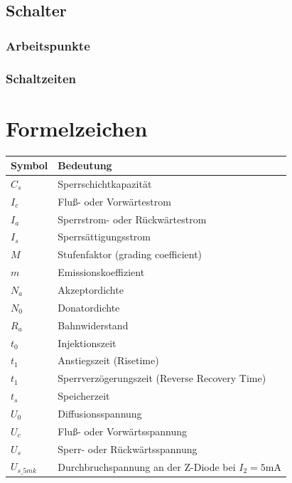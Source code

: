 \documentclass[
	a4paper, %
	12pt, %
]{CSUniSchoolLabReport}
\begin{document}
\subsection{Schalter}
\subsubsection{Arbeitspunkte}
\subsubsection{Schaltzeiten}


\section{Formelzeichen}
\begin{table}[H]
\centering
\begin{tabular}{ll}
\toprule
\textbf{Symbol} & \textbf{Bedeutung} \\
\midrule
$C_s$    & Sperrschichtkapazität \\
$I_c$    & Fluß- oder Vorwärtestrom \\
$I_a$    & Sperrstrom- oder Rückwärtestrom \\
$I_s$    & Sperrsättigungsstrom \\
$M$      & Stufenfaktor (grading coefficient) \\
$m$      & Emissionskoeffizient \\
$N_a$    & Akzeptordichte \\
$N_0$    & Donatordichte \\
$R_a$    & Bahnwiderstand \\
$t_0$    & Injektionszeit \\
$t_1$    & Anstiegszeit (Risetime) \\
$t_1$    & Sperrverzögerungszeit (Reverse Recovery Time) \\
$t_s$    & Speicherzeit \\
$U_0$    & Diffusionsspannung \\
$U_c$    & Fluß- oder Vorwärtsspannung \\
$U_s$    & Sperr- oder Rückwärtsspannung \\
$U_{s\_5mk}$ & Durchbruchspannung an der Z-Diode bei $I_2 = 5$mA \\
\bottomrule
\end{tabular}
\end{table}

\printbibliography %


\end{document}
